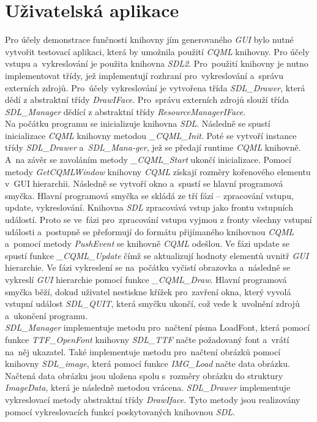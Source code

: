 \documentclass[11pt,twoside,a4paper]{book}
\begin{document}
\section{Uživatelská aplikace}
Pro účely demonstrace funčnosti knihovny jím generovaného \textit{GUI} bylo nutné vytvořit testovací aplikaci, která by umožnila použití \textit{CQML} knihovny.
Pro účely vstupu a~vykreslování je použita knihovna \textit{SDL2}. Pro~použití knihovny je nutno implementovat třídy, jež implementují rozhraní pro~vykreslování a~správu externích zdrojů. Pro~účely vykreslování je vytvořena třída \textit{SDL\_Drawer}, která dědí z abstraktní třídy \textit{DrawIFace}. Pro~správu externích zdrojů slouží třída \textit{SDL\_Manager} dědící z abstraktní třídy \textit{ResourceManagerIFace}.\\
Na počátku programu se inicializuje knihovna \textit{SDL}. Následně se spustí inicializace \textit{CQML} knihovny metodou \textit{\_CQML\_Init}. Poté se vytvoří instance třídy \textit{SDL\_Drawer} a~\textit{SDL\_Mana-ger}, jež se předají runtime \textit{CQML} knihovně. A~na závěr se zavoláním metody \textit{\_CQML\_Start} ukončí inicializace. Pomocí metody \textit{GetCQMLWindow} knihovny \textit{CQML} získají rozměry kořenového elementu v~GUI hierarchii.
Následně se vytvoří okno a~spustí se hlavní programová smyčka. Hlavní programová smyčka se skládá ze tří fází – zpracování vstupu, update, vykreslování.
Knihovna \textit{SDL} zpracovává vstup jako frontu vstupních událostí. Proto se ve~fázi pro~zpracování vstupu vyjmou z fronty všechny vstupní události a~postupně se přeformují do formátu přijímaného knihovnou \textit{CQML} a~pomocí metody \textit{PushEvent} se knihovně \textit{CQML} odešlou. Ve fázi update se spustí funkce \textit{\_CQML\_Update} čímž se aktualizují hodnoty elementů uvnitř \textit{GUI} hierarchie. Ve fázi vykreslení se na~počátku vyčistí obrazovka a~následně se vykreslí \textit{GUI} hierarchie pomocí funkce \textit{\_CQML\_Draw}. Hlavní programová smyčka běží, dokud uživatel nestiskne křížek pro~zavření okna, který vyvolá vstupní událost \textit{SDL\_QUIT}, která smyčku ukončí, což vede k~uvolnění zdrojů a~ukončení programu.\\
\textit{SDL\_Manager} implementuje metodu pro~načtení písma LoadFont, která pomocí funkce \textit{TTF\_OpenFont} knihovny \textit{SDL\_TTF} načte požadovaný font a~vrátí na~něj ukazatel. Také implementuje metodu pro~načtení obrázků pomocí knihovny \textit{SDL\_image}, která pomocí funkce \textit{IMG\_Load} načte data obrázku. Načtená data obrázku jsou uložena spolu s~rozměry obrázku do struktury \textit{ImageData}, která je následně metodou vrácena. 
\textit{SDL\_Drawer} implementuje vykreslovací metody abstraktní třídy \textit{DrawIface}. Tyto metody jsou realizovány pomocí vykreslovacích funkcí poskytovaných knihovnou \textit{SDL}.
\end{document}
